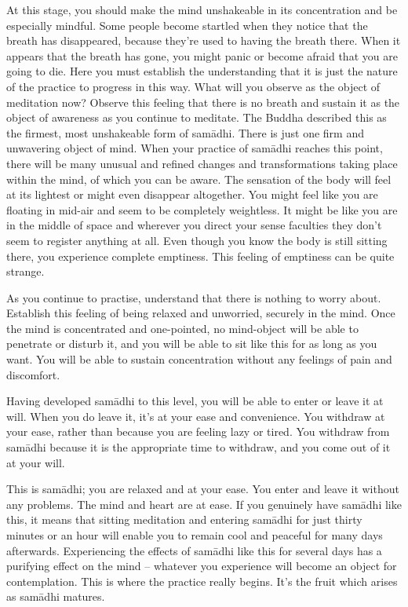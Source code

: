 At this stage, you should make the mind unshakeable in its concentration and be especially mindful. Some people become startled when they notice that the breath has disappeared, because they're used to having the breath there. When it appears that the breath has gone, you might panic or become afraid that you are going to die. Here you must establish the understanding that it is just the nature of the practice to progress in this way. What will you observe as the object of meditation now? Observe this feeling that there is no breath and sustain it as the object of awareness as you continue to meditate. The Buddha described this as the firmest, most unshakeable form of sam\=adhi. There is just one firm and unwavering object of mind. When your practice of sam\=adhi reaches this point, there will be many unusual and refined changes and transformations taking place within the mind, of which you can be aware. The sensation of the body will feel at its lightest or might even disappear altogether. You might feel like you are floating in mid-air and seem to be completely weightless. It might be like you are in the middle of space and wherever you direct your sense faculties they don't seem to register anything at all. Even though you know the body is still sitting there, you experience complete emptiness. This feeling of emptiness can be quite strange.

As you continue to practise, understand that there is nothing to worry about. Establish this feeling of being relaxed and unworried, securely in the mind. Once the mind is concentrated and one-pointed, no mind-object will be able to penetrate or disturb it, and you will be able to sit like this for as long as you want. You will be able to sustain concentration without any feelings of pain and discomfort.

Having developed sam\=adhi to this level, you will be able to enter or leave it at will. When you do leave it, it's at your ease and convenience. You withdraw at your ease, rather than because you are feeling lazy or tired. You withdraw from sam\=adhi because it is the appropriate time to withdraw, and you come out of it at your will.

This is sam\=adhi; you are relaxed and at your ease. You enter and leave it without any problems. The mind and heart are at ease. If you genuinely have sam\=adhi like this, it means that sitting meditation and entering sam\=adhi for just thirty minutes or an hour will enable you to remain cool and peaceful for many days afterwards. Experiencing the effects of sam\=adhi like this for several days has a purifying effect on the mind -- whatever you experience will become an object for contemplation. This is where the practice really begins. It's the fruit which arises as sam\=adhi matures.

